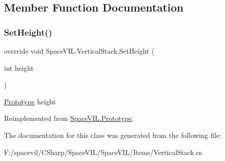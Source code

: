 \subsection{Member Function Documentation}
\mbox{\label{class_space_v_i_l_1_1_vertical_stack_a1e2360b005a6fb8e503dc60d27f1f021}} 
\subsubsection{\texorpdfstring{Set\+Height()}{SetHeight()}}
{\footnotesize\ttfamily override void Space\+V\+I\+L.\+Vertical\+Stack.\+Set\+Height (\begin{DoxyParamCaption}\item[{int}]{height }\end{DoxyParamCaption})\hspace{0.3cm}{\ttfamily [virtual]}}



\mbox{\hyperlink{class_space_v_i_l_1_1_prototype}{Prototype}} height 



Reimplemented from \mbox{\hyperlink{class_space_v_i_l_1_1_prototype_adc0adcbd1c3800d9525798ba7be5832a}{Space\+V\+I\+L.\+Prototype}}.



The documentation for this class was generated from the following file\+:\begin{DoxyCompactItemize}
\item 
F\+:/spacevil/\+C\+Sharp/\+Space\+V\+I\+L/\+Space\+V\+I\+L/\+Items/Vertical\+Stack.\+cs\end{DoxyCompactItemize}

